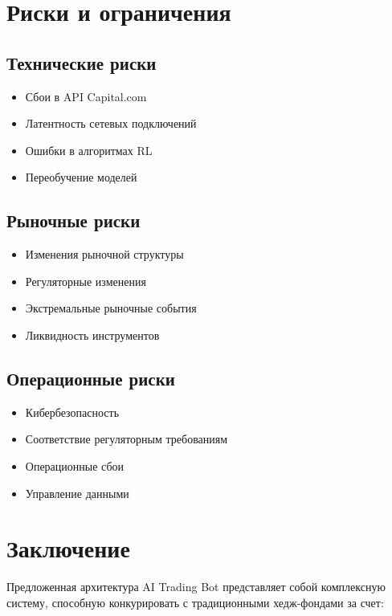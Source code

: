 \documentclass[12pt,a4paper]{article}
\begin{document}
\section{Риски и ограничения}

\subsection{Технические риски}
\begin{itemize}
    \item Сбои в API Capital.com
    \item Латентность сетевых подключений
    \item Ошибки в алгоритмах RL
    \item Переобучение моделей
\end{itemize}

\subsection{Рыночные риски}
\begin{itemize}
    \item Изменения рыночной структуры
    \item Регуляторные изменения
    \item Экстремальные рыночные события
    \item Ликвидность инструментов
\end{itemize}

\subsection{Операционные риски}
\begin{itemize}
    \item Кибербезопасность
    \item Соответствие регуляторным требованиям
    \item Операционные сбои
    \item Управление данными
\end{itemize}

\section{Заключение}

Предложенная архитектура AI Trading Bot представляет собой комплексную систему, способную конкурировать с традиционными хедж-фондами за счет:
\end{document}
